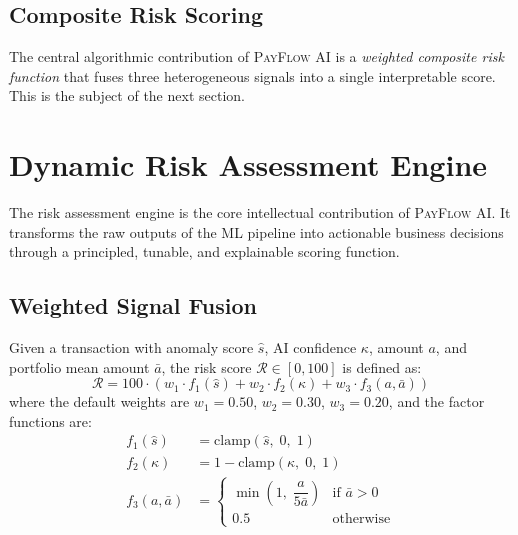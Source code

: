 \documentclass[11pt,a4paper]{article}
\newcommand{\payflow}{\textsc{PayFlow AI}}
\newcommand{\risk}{\mathcal{R}}
\newcommand{\confidence}{\kappa}
\newcommand{\anomaly}{\hat{s}}
\begin{document}
\subsection{Composite Risk Scoring}
\label{subsec:composite}

The central algorithmic contribution of \payflow{} is a \emph{weighted composite risk function} that fuses three heterogeneous signals into a single interpretable score. This is the subject of the next section.


\section{Dynamic Risk Assessment Engine}
\label{sec:risk-engine}

The risk assessment engine is the core intellectual contribution of \payflow. It transforms the raw outputs of the ML pipeline into actionable business decisions through a principled, tunable, and explainable scoring function.

\subsection{Weighted Signal Fusion}
\label{subsec:signal-fusion}

\begin{definition}
\label{def:risk-score}
Given a transaction with anomaly score $\anomaly$, AI confidence $\confidence$, amount $a$, and portfolio mean amount $\bar{a}$, the risk score $\risk \in [0, 100]$ is defined as:
\begin{equation}
  \risk = 100 \cdot \left( w_1 \cdot f_1(\anomaly) + w_2 \cdot f_2(\confidence) + w_3 \cdot f_3(a, \bar{a}) \right)
  \label{eq:risk-score}
\end{equation}
where the default weights are $w_1 = 0.50$, $w_2 = 0.30$, $w_3 = 0.20$, and the factor functions are:
\begin{align}
  f_1(\anomaly) &= \text{clamp}(\anomaly,\; 0,\; 1) \\
  f_2(\confidence) &= 1 - \text{clamp}(\confidence,\; 0,\; 1) \\
  f_3(a, \bar{a}) &= \begin{cases}
    \min\left(1,\; \dfrac{a}{5\bar{a}}\right) & \text{if } \bar{a} > 0 \\[1em]
    0.5 & \text{otherwise}
  \end{cases}
\end{align}
\end{definition}
\end{document}

